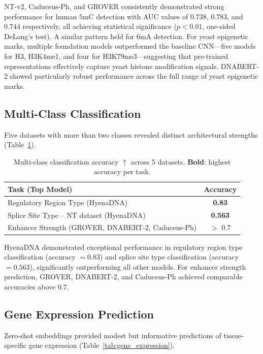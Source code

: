 \documentclass[11pt]{article}
\begin{document}
NT-v2, Caduceus-Ph, and GROVER consistently demonstrated strong performance for human $5$mC detection with AUC values of $0.738$, $0.783$, and $0.744$ respectively, all achieving statistical significance ($p < 0.01$, one-sided DeLong's test). A similar pattern held for $6$mA detection. For yeast epigenetic marks, multiple foundation models outperformed the baseline CNN---five models for H3, H3K4me1, and four for H3K79me3---suggesting that pre-trained representations effectively capture yeast histone modification signals. DNABERT-2 showed particularly robust performance across the full range of yeast epigenetic marks.

\subsection{Multi-Class Classification}

Five datasets with more than two classes revealed distinct architectural strengths (Table~\ref{tab:multiclass}).

\begin{table}[htbp]
\centering
\caption{Multi-class classification accuracy $\uparrow$ across 5 datasets. \textbf{Bold}: highest accuracy per task.}
\label{tab:multiclass}
\begin{tabular}{lc}
\toprule
\textbf{Task (Top Model)} & \textbf{Accuracy} \\
\midrule
Regulatory Region Type (HyenaDNA) & \textbf{0.83} \\
Splice Site Type -- NT dataset (HyenaDNA) & \textbf{0.563} \\
Enhancer Strength (GROVER, DNABERT-2, Caduceus-Ph) & $>$ 0.7 \\
\bottomrule
\end{tabular}
\end{table}

HyenaDNA demonstrated exceptional performance in regulatory region type classification (accuracy $= 0.83$) and splice site type classification (accuracy $= 0.563$), significantly outperforming all other models. For enhancer strength prediction, GROVER, DNABERT-2, and Caduceus-Ph achieved comparable accuracies above $0.7$.

\subsection{Gene Expression Prediction}

Zero-shot embeddings provided modest but informative predictions of tissue-specific gene expression (Table~\ref{tab:gene_expression}).
\end{document}
